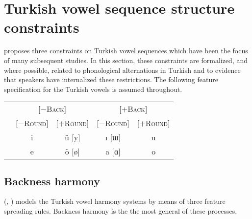 

\section{Turkish vowel sequence structure constraints}

\citet{Lees1966b,Lees1966a} 
proposes three constraints on Turkish vowel sequences which have been the focus of many subsequent studies. In this section, these constraints are formalized, and where possible, related to phonological alternations in Turkish and to evidence that speakers have internalized these restrictions. The following feature specification for the Turkish vowels is assumed throughout.

\begin{example}
\begin{tabular}{c c c c c}
                       & \multicolumn{2}{c}{[$-$\textsc{Back}]} & \multicolumn{2}{c}{[$+$\textsc{Back}]} \\
                       & [$-$\textsc{Round}] & [$+$\textsc{Round}] & [$-$\textsc{Round}] & [$+$\textsc{Round}] \\ %
{} & {i} & {ü} [y] & {ı} [ɯ] & {u} \\
 & {e} & {ö} [ø] & {a} [ɑ] & {o} \\
\end{tabular}
\end{example}

\subsection{Backness harmony}

\citeauthor{Lees1966b} (\citeyear[][35]{Lees1966b}, \citeyear[][284]{Lees1966a}) models the Turkish vowel harmony systems by means of three feature spreading rules. Backness harmony is the the most general of these processes.  

